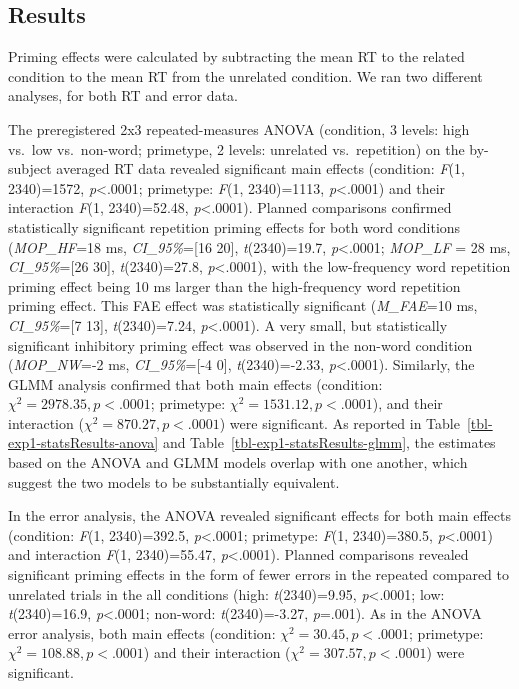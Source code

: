 \documentclass[
]{interact}
\begin{document}
\subsection{Results}\label{sec-exp1-results}

Priming effects were calculated by subtracting the mean RT to the
related condition to the mean RT from the unrelated condition. We ran
two different analyses, for both RT and error data.

The preregistered 2x3 repeated-measures ANOVA (condition, 3 levels: high
vs.~low vs.~non-word; primetype, 2 levels: unrelated vs.~repetition) on
the by-subject averaged RT data revealed significant main effects
(condition: \emph{F}(1, 2340)=1572, \emph{p}\textless.0001; primetype:
\emph{F}(1, 2340)=1113, \emph{p}\textless.0001) and their interaction
\emph{F}(1, 2340)=52.48, \emph{p}\textless.0001). Planned comparisons
confirmed statistically significant repetition priming effects for both
word conditions (\emph{MOP\_HF}=18 ms, \emph{CI\_95\%}={[}16 20{]},
\emph{t}(2340)=19.7, \emph{p}\textless.0001; \emph{MOP\_LF} = 28 ms,
\emph{CI\_95\%}={[}26 30{]}, \emph{t}(2340)=27.8,
\emph{p}\textless.0001), with the low-frequency word repetition priming
effect being 10 ms larger than the high-frequency word repetition
priming effect. This FAE effect was statistically significant
(\emph{M\_FAE}=10 ms, \emph{CI\_95\%}={[}7 13{]}, \emph{t}(2340)=7.24,
\emph{p}\textless.0001). A very small, but statistically significant
inhibitory priming effect was observed in the non-word condition
(\emph{MOP\_NW}=-2 ms, \emph{CI\_95\%}={[}-4 0{]}, \emph{t}(2340)=-2.33,
\emph{p}\textless.0001). Similarly, the GLMM analysis confirmed that
both main effects (condition: \(\chi^2=2978.35, p<.0001\); primetype:
\(\chi^2=1531.12, p<.0001\)), and their interaction
(\(\chi^2=870.27, p<.0001\)) were significant. As reported in
Table~\ref{tbl-exp1-statsResults-anova} and
Table~\ref{tbl-exp1-statsResults-glmm}, the estimates based on the ANOVA
and GLMM models overlap with one another, which suggest the two models
to be substantially equivalent.

In the error analysis, the ANOVA revealed significant effects for both
main effects (condition: \emph{F}(1, 2340)=392.5,
\emph{p}\textless.0001; primetype: \emph{F}(1, 2340)=380.5,
\emph{p}\textless.0001) and interaction \emph{F}(1, 2340)=55.47,
\emph{p}\textless.0001). Planned comparisons revealed significant
priming effects in the form of fewer errors in the repeated compared to
unrelated trials in the all conditions (high: \emph{t}(2340)=9.95,
\emph{p}\textless.0001; low: \emph{t}(2340)=16.9,
\emph{p}\textless.0001; non-word: \emph{t}(2340)=-3.27, \emph{p}=.001).
As in the ANOVA error analysis, both main effects (condition:
\(\chi^2=30.45, p<.0001\); primetype: \(\chi^2=108.88, p<.0001\)) and
their interaction (\(\chi^2=307.57, p<.0001\)) were significant.
\end{document}
